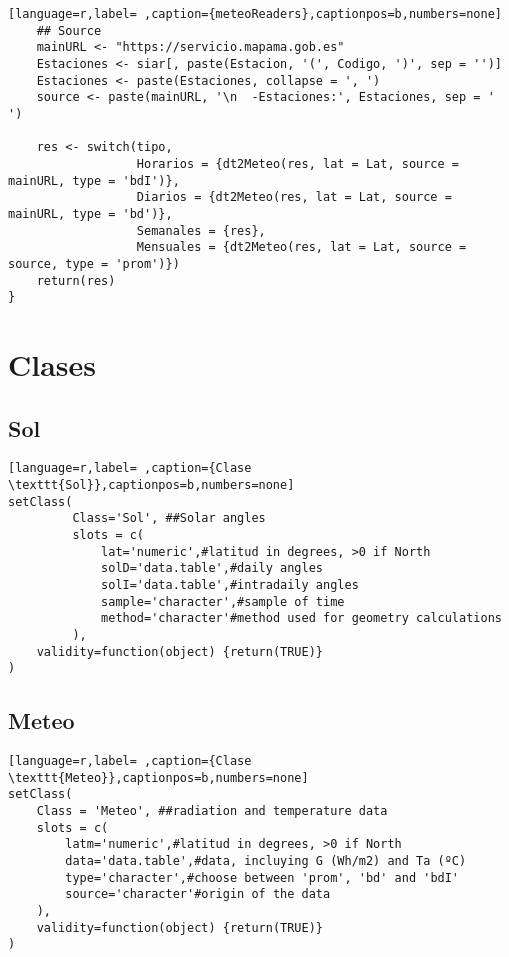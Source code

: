 \begin{lstlisting}[language=r,label= ,caption={meteoReaders},captionpos=b,numbers=none]
    ## Source
    mainURL <- "https://servicio.mapama.gob.es"
    Estaciones <- siar[, paste(Estacion, '(', Codigo, ')', sep = '')]
    Estaciones <- paste(Estaciones, collapse = ', ')
    source <- paste(mainURL, '\n  -Estaciones:', Estaciones, sep = ' ')

    res <- switch(tipo,
                  Horarios = {dt2Meteo(res, lat = Lat, source = mainURL, type = 'bdI')},
                  Diarios = {dt2Meteo(res, lat = Lat, source = mainURL, type = 'bd')},
                  Semanales = {res},
                  Mensuales = {dt2Meteo(res, lat = Lat, source = source, type = 'prom')})
    return(res)
}
\end{lstlisting}

\section{Clases}
\label{sec:org9848042}
\subsection{Sol}
\label{sec:orgaf9a075}
\label{subsec:sol}
\begin{lstlisting}[language=r,label= ,caption={Clase \texttt{Sol}},captionpos=b,numbers=none]
setClass(
         Class='Sol', ##Solar angles
         slots = c(
             lat='numeric',#latitud in degrees, >0 if North
             solD='data.table',#daily angles
             solI='data.table',#intradaily angles
             sample='character',#sample of time
             method='character'#method used for geometry calculations
         ),
    validity=function(object) {return(TRUE)}
)
\end{lstlisting}
\subsection{Meteo}
\label{sec:org6fa821d}
\label{subsec:meteo}
\begin{lstlisting}[language=r,label= ,caption={Clase \texttt{Meteo}},captionpos=b,numbers=none]
setClass(
    Class = 'Meteo', ##radiation and temperature data
    slots = c(
        latm='numeric',#latitud in degrees, >0 if North
        data='data.table',#data, incluying G (Wh/m2) and Ta (ºC)
        type='character',#choose between 'prom', 'bd' and 'bdI'
        source='character'#origin of the data
    ),
    validity=function(object) {return(TRUE)}
)
\end{lstlisting}
